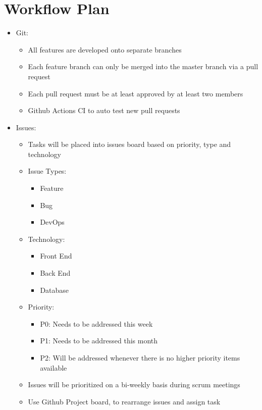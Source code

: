 \documentclass{article}
\begin{document}
\section{Workflow Plan}

\begin{itemize}
    \item Git: \begin{itemize}
        \item All features are developed onto separate branches
        \item Each feature branch can only be merged into the master branch via a pull request
        \item Each pull request must be at least approved by at least two members
        \item Github Actions CI to auto test new pull requests
    \end{itemize}
	\item Issues: \begin{itemize}
	    \item Tasks will be placed into issues board based on priority, type and technology
        \item Issue Types:
            \begin{itemize}
                \item Feature
                \item Bug
                \item DevOps
            \end{itemize}
        \item Technology: 
        \begin{itemize}
                \item Front End
                \item Back End
                \item Database
            \end{itemize}
        \item Priority:
        \begin{itemize}
            \item P0: Needs to be addressed this week
            \item P1: Needs to be addressed this month
            \item P2: Will be addressed whenever there is no higher priority items available
        \end{itemize}
        \item Issues will be prioritized on a bi-weekly basis during scrum meetings
        \item Use Github Project board, to rearrange issues and assign task
	\end{itemize}
\end{itemize}
\end{document}
